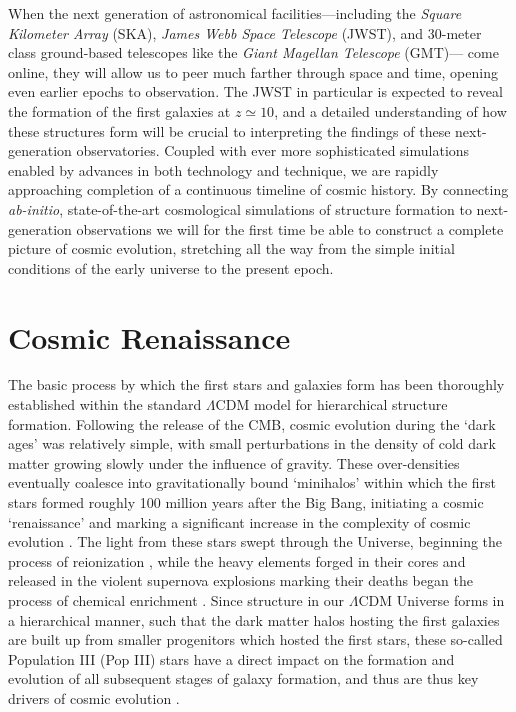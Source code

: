 \documentclass[../thesis.tex]{subfiles}
\begin{document}
When the next generation of astronomical facilities---including the \textit{Square Kilometer Array} (SKA), \textit{James Webb Space Telescope} (JWST), and 30-meter class ground-based telescopes like the \textit{Giant Magellan Telescope} (GMT)--- come online, they will allow us to peer much farther through space and time, opening even earlier epochs to observation.
The JWST in particular is expected to reveal the formation of the first galaxies at $z\simeq10$, and a detailed understanding of how these structures form will be crucial to interpreting the findings of these next-generation observatories.
Coupled with ever more sophisticated simulations enabled by advances in both technology and technique, we are rapidly approaching completion of a continuous timeline of cosmic history. 
By connecting \textit{ab-initio}, state-of-the-art cosmological simulations of structure formation to next-generation observations we will for the first time be able to construct a complete picture of cosmic evolution, stretching all the way from the simple initial conditions of the early universe to the present epoch.

\section{Cosmic Renaissance}
The basic process by which the first stars and galaxies form has been thoroughly established within the standard $\Lambda$CDM model for hierarchical structure formation.
Following the release of the CMB, cosmic evolution during the `dark ages' was relatively simple, with small perturbations in the density of cold dark matter 
growing slowly under the influence of gravity.
These over-densities eventually coalesce into gravitationally bound `minihalos' within which the first stars formed roughly 100 million years after the Big Bang, initiating a cosmic `renaissance' and marking a significant increase in the complexity of cosmic evolution \citep{BarkanaLoeb2001, Miralda-Escude2003, Brommetal2009, Loeb2010}.
The light from these stars swept through the Universe, beginning the process of reionization \citep[e.g.,][]{Meiksin2009}, while the heavy elements forged in their cores and released in the violent supernova explosions marking their deaths began the process of chemical enrichment \citep[e.g.,][]{KarlssonBrommHawthorn2013}.
Since structure in our $\Lambda$CDM Universe forms in a hierarchical manner, such that the dark matter halos hosting the first galaxies are built up from smaller progenitors which hosted the first stars, these so-called Population III (Pop III) stars have a direct impact on the formation and evolution of all subsequent stages of galaxy formation, and thus are thus key drivers of cosmic evolution \citep{Bromm2013}.  
\end{document}
